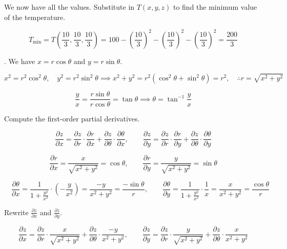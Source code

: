 \documentclass{article}
\begin{document}
\hfill

\noindent We now have all the values. Substitute in $T(x,y,z)$ to find the minimum value of the temperature.

\[T_{\text{min}}=T\left(\frac{10}{3},\frac{10}{3},\frac{10}{3}\right)=100-\left(\frac{10}{3}\right)^2-\left(\frac{10}{3}\right)^2-\left(\frac{10}{3}\right)^2=\boxed{\frac{200}{3}}\]

\hfill

. We have $x=r\cos\theta$ and $y=r\sin\theta$.

\[x^2=r^2\cos^2\theta,\quad y^2 =r^2\sin^2\theta\implies x^2+y^2=r^2\left(\cos^2\theta+\sin^2\theta\right)=r^2, \quad \therefore  r=\sqrt{x^2+y^2}\]

\[\frac{y}{x}=\frac{r\sin\theta}{r\cos\theta}=\tan\theta \implies \theta=\tan^{-1}\frac{y}{x}\]

\hfill

\noindent Compute the first-order partial derivatives.

\[\frac{\partial z}{\partial x}=\frac{\partial z}{\partial r}\cdot\frac{\partial r}{\partial x}+\frac{\partial z}{\partial \theta}\cdot\frac{\partial\theta}{\partial x},\quad\quad\frac{\partial z}{\partial y}=\frac{\partial z}{\partial r}\cdot\frac{\partial r}{\partial y} + \frac{\partial z}{\partial\theta}\cdot\frac{\partial\theta}{\partial y}\]

\hfill

\[\frac{\partial r}{\partial x}=\frac{x}{\sqrt{x^2+y^2}}=\cos\theta,\quad\quad\frac{\partial r}{\partial y}=\frac{y}{\sqrt{x^2+y^2}}=\sin\theta\]

\newpage

\[\quad\frac{\partial\theta}{\partial x}=\frac{1}{\displaystyle 1+\frac{y^2}{x^2}}\cdot \left(-\frac{y}{x^2}\right)=\frac{-y}{x^2+y^2}=\frac{-\sin\theta}{r},\quad\quad\frac{\partial\theta}{\partial y}=\frac{1}{\displaystyle1+\frac{y^2}{x^2}}\cdot\frac{1}{x}=\frac{x}{x^2+y^2}=\frac{\cos\theta}{r}\]

\hfill

\noindent Rewrite $\displaystyle\frac{\partial z}{\partial x}$ and $\displaystyle\frac{\partial z}{\partial y}$.

\[\frac{\partial z}{\partial x}=\frac{\partial z}{\partial r}\cdot\frac{x}{\sqrt{x^2+y^2}}+\frac{\partial z}{\partial\theta}\cdot\frac{-y}{x^2+y^2},\quad\quad\frac{\partial z}{\partial y}=\frac{\partial z}{\partial r}\cdot\frac{y}{\sqrt{x^2+y^2}}+\frac{\partial z}{\partial \theta}\cdot\frac{x}{x^2+y^2}\]
\end{document}
